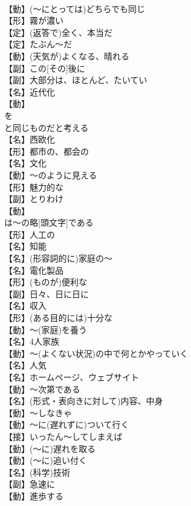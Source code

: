 \documentclass[8pt]{extreport}
\begin{document}
\begin{CJK}{UTF8}{min}
\\	【動】(～にとっては)どちらでも同じ
\\	【形】霧が濃い
\\	【定】(返答で)全く、本当だ
\\	【定】たぶん～だ
\\	【動】(天気が)よくなる、晴れる
\\	【副】この[その]後に
\\	【副】大部分は、ほとんど、たいてい
\\	【名】近代化
\\	【動】
\\	を
\\	と同じものだと考える
\\	【名】西欧化
\\	【形】都市の、都会の
\\	【名】文化
\\	【動】～のように見える
\\	【形】魅力的な
\\	【副】とりわけ
\\	【動】
\\	は～の略[頭文字]である
\\	【形】人工の
\\	【名】知能
\\	【名】(形容詞的に)家庭の～
\\	【名】電化製品
\\	【形】(ものが)便利な
\\	【副】日々、日に日に
\\	【名】収入
\\	【形】(ある目的には)十分な
\\	【動】～(家庭)を養う
\\	【名】4人家族
\\	【動】～(よくない状況)の中で何とかやっていく
\\	【名】人気
\\	【名】ホームページ、ウェブサイト
\\	【動】～次第である
\\	【名】(形式・表向きに対して)内容、中身
\\	【動】～しなきゃ
\\	【動】～に(遅れずに)ついて行く
\\	【接】いったん～してしまえば
\\	【動】(～に)遅れを取る
\\	【動】(～に)追い付く
\\	【名】(科学)技術
\\	【副】急速に
\\	【動】進歩する

\end{CJK}
\end{document}
